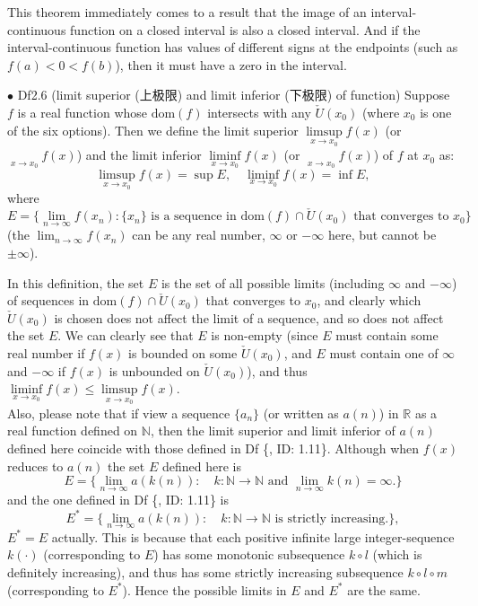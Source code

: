 \documentclass{article}
\begin{document}
\begin{Rmk}{}
    \textcolor{Th}{This theorem immediately comes to a result that the image of an interval-continuous function on a closed interval is also a closed interval. And if the interval-continuous function has values of different signs at the endpoints (such as $f(a)<0<f(b)$), then it must have a zero in the interval.}
\end{Rmk}

\begin{Df}{$\bullet$ Df2.6 (limit superior (上极限) and limit inferior (下极限) of function)}
    Suppose $f$ is a real function whose $\text{dom}(f)$ intersects with any $\check{U}(x_0)$ (where $x_0$ is one of the six options). Then we define the limit superior $\limsup\limits_{x\to x_0} f(x)$ (or $\mathop{\overline{\lim}}\limits_{x\to x_0}f(x)$) and the limit inferior $\liminf\limits_{x\to x_0} f(x)$ (or $\mathop{\underline{\lim}}\limits_{x\to x_0}f(x)$) of $f$ at $x_0$ as:
    $$\limsup\limits_{x\to x_0} f(x) = \sup E, \quad \liminf\limits_{x\to x_0} f(x) = \inf E,$$
    where 
    $$E = \{\lim\limits_{n\to\infty} f(x_n): \{x_n\}\text{ is a sequence in }\text{dom}(f)\cap\check{U}(x_0)\text{ that converges to } x_0\}$$ 
    (the $\lim_{n\to\infty} f(x_n)$ can be any real number, $\infty$ or $-\infty$ here, but cannot be $\pm\infty$).
\end{Df}

\begin{Rmk}{}
    In this definition, the set $E$ is the set of all possible limits (including $\infty$ and $-\infty$) of sequences in $\text{dom}(f)\cap\check{U}(x_0)$ that converges to $x_0$, and clearly which $\check{U}(x_0)$ is chosen does not affect the limit of a sequence, and so does not affect the set $E$. \textcolor{Th}{We can clearly see that $E$ is non-empty (since $E$ must contain some real number if $f(x)$ is bounded on some $\check{U}(x_0)$, and $E$ must contain one of $\infty$ and $-\infty$ if $f(x)$ is unbounded on $\check{U}(x_0)$), and thus $\liminf\limits_{x\to x_0} f(x)\leq \limsup\limits_{x\to x_0} f(x)$.}\\
    Also, please note that if view a sequence $\{a_n\}$ (or written as $a(n)$) in $\mathbb{R}$ as a real function defined on $\mathbb{N}$, then \textcolor{Th}{the limit superior and limit inferior of $a(n)$ defined here coincide with those defined in Df \{, ID: 1.11\}.} Although when $f(x)$ reduces to $a(n)$ the set $E$ defined here is 
    $$E = \{\lim\limits_{n\to\infty} a(k(n)): \quad k: \mathbb{N}\rightarrow\mathbb{N}\text{ and }\lim\limits_{n\to\infty} k(n) = \infty.\}$$
    and the one defined in Df \{, ID: 1.11\} is
    $$E^\ast = \{\lim\limits_{n\to\infty} a(k(n)): \quad k: \mathbb{N}\rightarrow\mathbb{N}\text{ is strictly increasing.}\},$$
    $E^\ast = E$ actually. This is because that each positive infinite large integer-sequence $k(\cdot)$ (corresponding to $E$) has some monotonic subsequence $k\circ l$ (which is definitely increasing), and thus has some strictly increasing subsequence $k\circ l\circ m$ (corresponding to $E^\ast$). Hence the possible limits in $E$ and $E^\ast$ are the same.
\end{Rmk}
\end{document}
